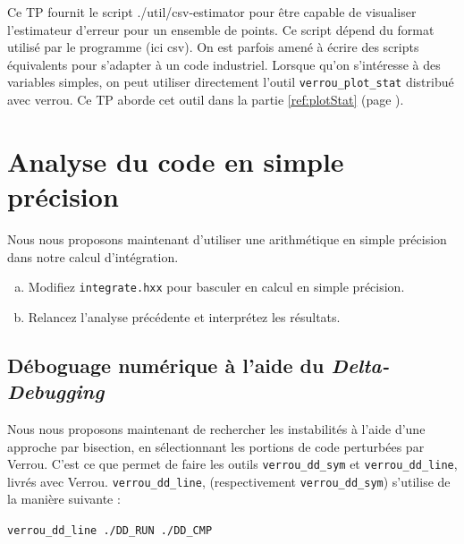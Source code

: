 \documentclass[a4paper]{article}
\newcounter{Question}
\newenvironment{question}[1][\unskip]{
  \bigskip
  \stepcounter{Question}
  \def\questionTitle{ #1}
  \begin{mdframed}[style=question]
  }{
  \end{mdframed}
}
\newenvironment{warn}[1][Attention :]{
  \begin{mdframed}[style=warning]
    \noindent{\bf #1}
}{
  \end{mdframed}
}
\begin{document}
\begin{warn}
  Ce TP fournit le script ./util/csv-estimator pour être capable de visualiser
  l'estimateur d'erreur pour un ensemble de points. Ce script dépend du format
  utilisé par le programme (ici csv). On est parfois amené à écrire des scripts
  équivalents pour s'adapter à un code industriel. Lorsque qu'on s'intéresse à
  des variables simples, on peut utiliser directement l'outil
  \texttt{verrou\_plot\_stat} distribué avec verrou. Ce TP aborde cet outil
  dans la partie \ref{ref:plotStat} (page \pageref{ref:plotStat}).
  
\end{warn}



\section{Analyse du code en simple précision}
\label{ref:AnalyseSimple}

Nous nous proposons maintenant d'utiliser une arithmétique en simple précision
dans notre calcul d'intégration.

\begin{question}
  \begin{enumerate}[(a)]
  \item Modifiez \texttt{integrate.hxx} pour basculer en calcul en simple
    précision.
  \item Relancez l'analyse précédente et interprétez les résultats.
  \end{enumerate}
\end{question}





\subsection{Déboguage numérique à l'aide du \textit{Delta-Debugging}}

Nous nous proposons maintenant de rechercher les instabilités à l'aide
d'une approche par bisection, en sélectionnant les portions de code perturbées
par Verrou. C'est ce que permet de faire les outils \texttt{verrou\_dd\_sym} et \texttt{verrou\_dd\_line}, livrés avec
Verrou. \texttt{verrou\_dd\_line}, (respectivement \texttt{verrou\_dd\_sym}) s'utilise de la manière suivante :
\begin{center}
  \tt verrou\_dd\_line ./DD\_RUN ./DD\_CMP
\end{center}
\end{document}
